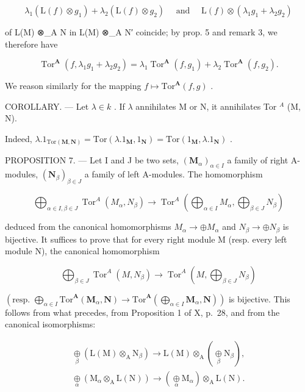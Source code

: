 \[
\lambda_ {1} (\mathrm{L} (f) \otimes g _ {1}) + \lambda_ {2} (\mathrm{L} (f) \otimes g _ {2}) \quad \text { and } \quad \mathrm{L} (f) \otimes (\lambda_ {1} g _ {1} + \lambda_ {2} g _ {2})
\]

of L(M) ⊗\_A N in L(M) ⊗\_A N′ coincide; by prop. 5 and remark 3, we therefore have

\[
\operatorname{Tor} ^ {\mathbf {A}} \left(f, \lambda_ {1} g _ {1} + \lambda_ {2} g _ {2}\right) = \lambda_ {1} \operatorname{Tor} ^ {\mathbf {A}} \left(f, g _ {1}\right) + \lambda_ {2} \operatorname{Tor} ^ {\mathbf {A}} \left(f, g _ {2}\right).\tag{10}
\]

We reason similarly for the mapping \(f\mapsto\mathrm{Tor}^{\mathbf{A}}(f,g)\) .

COROLLARY. --- Let \(\lambda\in k\) . If \(\lambda\) annihilates M or N, it annihilates Tor \(^{A}\) (M, N).

Indeed, \(\lambda .1_{\mathrm{Tor}(\mathbf{M},\mathbf{N})} = \mathrm{Tor}(\lambda .1_{\mathbf{M}},1_{\mathbf{N}}) = \mathrm{Tor}(1_{\mathbf{M}},\lambda .1_{\mathbf{N}})\) .

PROPOSITION 7. --- Let I and J be two sets, \((\mathbf{M}_{\alpha})_{\alpha \in I}\) a family of right A-modules, \((\mathbf{N}_{\beta})_{\beta \in J}\) a family of left A-modules. The homomorphism

\[
\bigoplus_ {\alpha \in I, \beta \in J} \operatorname{Tor} ^ {A} \left(M _ {\alpha}, N _ {\beta}\right)\rightarrow \operatorname{Tor} ^ {A} \left(\bigoplus_ {\alpha \in I} M _ {\alpha}, \bigoplus_ {\beta \in J} N _ {\beta}\right)
\]

deduced from the canonical homomorphisms \(M_{\alpha} \rightarrow \oplus M_{\alpha}\) and \(N_{\beta} \rightarrow \oplus N_{\beta}\) is bijective. It suffices to prove that for every right module M (resp. every left module N), the canonical homomorphism

\[
\bigoplus_ {\beta \in J} \operatorname{Tor} ^ {A} (M, N _ {\beta}) \rightarrow \operatorname{Tor} ^ {A} (M, \bigoplus_ {\beta \in J} N _ {\beta})
\]

\((\text{resp. } \bigoplus_{\alpha \in I} \text{Tor}^{\mathbf{A}}(\mathbf{M}_{\alpha}, \mathbf{N}) \to \text{Tor}^{\mathbf{A}} (\bigoplus_{\alpha \in I} \mathbf{M}_{\alpha}, \mathbf{N}))\) is bijective. This follows from what precedes, from Proposition 1 of X, p.~28, and from the canonical isomorphisms:

\[
\begin{array}{l} \underset {\beta} {\oplus} (\mathrm{L(M)} \otimes_ {\mathrm{A}} \mathrm {N}_ {\beta}) \to \mathrm{L(M)} \otimes_ {\mathrm{A}} (\underset {\beta} {\oplus} \mathrm {N}_ {\beta}), \\ \underset {\alpha} {\oplus} (\mathrm {M}_ {\alpha} \otimes_ {\mathrm{A}} \mathrm{L(N)}) \to (\underset {\alpha} {\oplus} \mathrm {M}_ {\alpha}) \otimes_ {\mathrm{A}} \mathrm{L(N)}. \end{array}
\]

